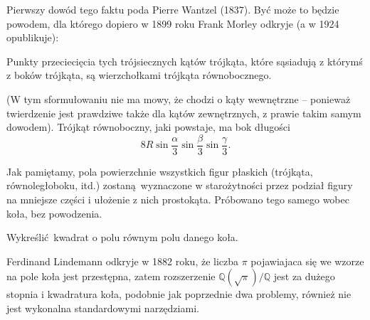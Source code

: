 Pierwszy dowód tego faktu poda Pierre Wantzel (1837).
Być może to będzie powodem, dla którego dopiero w 1899 roku Frank Morley odkryje (a w 1924 opublikuje):

\begin{theorem}[Morleya]
    Punkty przeciecięcia tych trójsiecznych kątów trójkąta, które sąsiadują z którymś z boków trójkąta, są wierzchołkami trójkąta równobocznego.
\end{theorem}

(W tym sformułowaniu nie ma mowy, że chodzi o kąty wewnętrzne -- ponieważ twierdzenie jest prawdziwe także dla kątów zewnętrznych, z prawie takim samym dowodem).
Trójkąt równoboczny, jaki powstaje, ma bok długości
\begin{equation}
    8 R \sin \frac \alpha 3 \sin \frac \beta 3 \sin \frac \gamma 3.
\end{equation}

Jak pamiętamy, pola powierzchnie wszystkich figur płaskich (trójkąta, równoległoboku, itd.) zostaną wyznaczone w starożytności przez podział figury na mniejsze części i ułożenie z nich prostokąta.
Próbowano tego samego wobec koła, bez powodzenia.

\begin{problem}
%
    Wykreślić kwadrat o polu równym polu danego koła.
\end{problem}

Ferdinand Lindemann odkryje w 1882 roku, że liczba $\pi$ pojawiajaca się we wzorze na pole koła jest przestępna, zatem rozszerzenie $\mathbb Q(\sqrt{\pi}) / \mathbb Q$ jest za dużego stopnia i kwadratura koła, podobnie jak poprzednie dwa problemy, również nie jest wykonalna standardowymi narzędziami.


